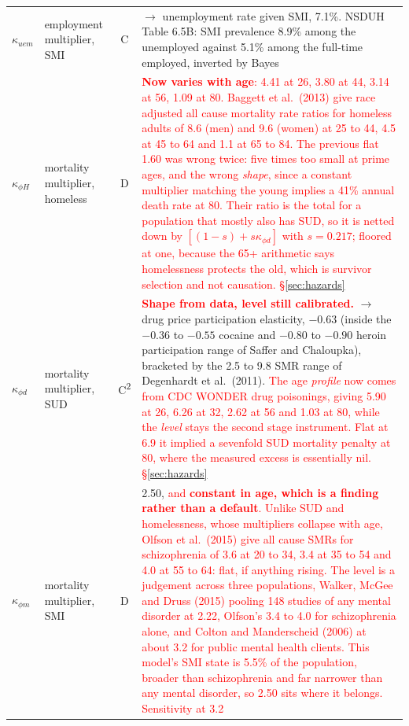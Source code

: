 \documentclass[11pt]{article}
\newcommand{\nw}[1]{\textcolor{red}{#1}}
\begin{document}
\begin{longtable}{lL{3.8cm}cL{5.8cm}}
$\kappa_{uem}$ & employment multiplier, SMI & C & $\rightarrow$ unemployment rate given SMI, 7.1\%. NSDUH Table 6.5B: SMI prevalence 8.9\% among the unemployed against 5.1\% among the full-time employed, inverted by Bayes\\
$\kappa_{\phi H}$ & mortality multiplier, homeless & D & \nw{\textbf{Now varies with age}: 4.41 at 26, 3.80 at 44, 3.14 at 56, 1.09 at 80. Baggett et al.\ (2013) give race adjusted all cause mortality rate ratios for homeless adults of 8.6 (men) and 9.6 (women) at 25 to 44, 4.5 at 45 to 64 and 1.1 at 65 to 84. The previous flat 1.60 was wrong twice: five times too small at prime ages, and the wrong \emph{shape}, since a constant multiplier matching the young implies a 41\% annual death rate at 80. Their ratio is the total for a population that mostly also has SUD, so it is netted down by $[(1-s)+s\kappa_{\phi d}]$ with $s=0.217$; floored at one, because the 65+ arithmetic says homelessness protects the old, which is survivor selection and not causation. \S\ref{sec:hazards}}\\
$\kappa_{\phi d}$ & mortality multiplier, SUD & C\textsuperscript{2} & \nw{\textbf{Shape from data, level still calibrated.}} $\rightarrow$ drug price participation elasticity, $-0.63$ (inside the $-0.36$ to $-0.55$ cocaine and $-0.80$ to $-0.90$ heroin participation range of Saffer and Chaloupka), bracketed by the 2.5 to 9.8 SMR range of Degenhardt et al.\ (2011). \nw{The age \emph{profile} now comes from CDC WONDER drug poisonings, giving 5.90 at 26, 6.26 at 32, 2.62 at 56 and 1.03 at 80, while the \emph{level} stays the second stage instrument. Flat at 6.9 it implied a sevenfold SUD mortality penalty at 80, where the measured excess is essentially nil. \S\ref{sec:hazards}}\\
$\kappa_{\phi m}$ & mortality multiplier, SMI & D & 2.50, \nw{and \textbf{constant in age, which is a finding rather than a default}. Unlike SUD and homelessness, whose multipliers collapse with age, Olfson et al.\ (2015) give all cause SMRs for schizophrenia of 3.6 at 20 to 34, 3.4 at 35 to 54 and 4.0 at 55 to 64: flat, if anything rising. The level is a judgement across three populations, Walker, McGee and Druss (2015) pooling 148 studies of any mental disorder at 2.22, Olfson's 3.4 to 4.0 for schizophrenia alone, and Colton and Manderscheid (2006) at about 3.2 for public mental health clients. This model's SMI state is 5.5\% of the population, broader than schizophrenia and far narrower than any mental disorder, so 2.50 sits where it belongs. Sensitivity at 3.2}\\

\end{longtable}
\end{document}
